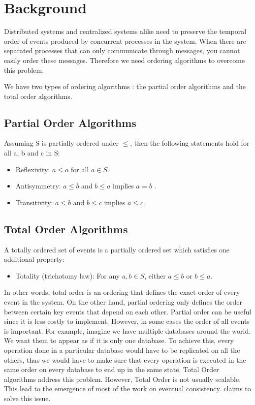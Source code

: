 \section{Background}
\label{sec:background}
Distributed systems and centralized systems alike need to preserve the temporal order of events produced by concurrent processes in the system. When there are separated processes that can only communicate through messages, you cannot easily order these messages.
Therefore we need ordering algorithms to overcome this problem.
\par
We have two types of ordering algorithms \autocite{lamport1978time}: the partial order algorithms and the total order algorithms.
\subsection{Partial Order Algorithms}
Assuming S is partially ordered under $\leq$, then the following statements hold for all a, b and c in S:
\begin{itemize}
	\item Reflexivity: $a \leq a$ for all $a \in S$.
	\item Antisymmetry: $a \leq b$ and $b \leq a$ implies $a=b$ .
	\item Transitivity: $a \leq b$  and $b \leq c$  implies $a \leq c$.
\end{itemize}

\subsection{Total Order Algorithms}
A totally ordered set of events is a partially ordered set which satisfies one additional property:
\begin{itemize}
	\item Totality (trichotomy law): For any $a, b \in S$, either $a \leq b$  or $b \leq a$.
\end{itemize}
\par
In other words, total order is an ordering that defines the exact order of every event in the system. On the other hand, partial ordering only defines the order between certain key events that depend on each other. Partial order can be useful since it is less costly to implement. However, in some cases the order of all events is important. For example, imagine we have multiple databases around the world. We want them to appear as if it is only one database. To achieve this, every operation done in a particular database would have to be replicated on all the others, thus we would have to make sure that every operation is executed in the same order on every database to end up in the same state.
Total Order algorithms address this problem.
However, Total Order is not usually scalable. This lead to the emergence of most of the work on eventual consistency. \epto claims to solve this issue.

